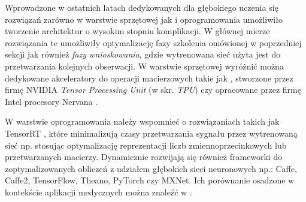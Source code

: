Wprowadzone w ostatnich latach dedykowanych dla głębokiego uczenia się rozwiązań zarówno w warstwie sprzętowej jak i oprogramowania umożliwiło tworzenie architektur o wysokim stopniu komplikacji. W głównej mierze rozwiązania te umożliwiły optymalizację fazy szkolenia omówionej w poprzedniej sekcji jak również \textit{fazy wnioskowania}, gdzie wytrenowana sieć użyta jest do przetwarzania kolejnych obserwacji. W warstwie sprzętowej wyróżnić można dedykowane akceleratory do operacji macierzowych takie jak \cite{DBLP:journals/corr/abs-1803-04014}, stworzone przez firmę NVIDIA \textit{Tensor Processing Unit} (w skr. \textit{TPU}) czy opracowane przez firmę Intel procesory Nervana \cite{Intel}. 

W warstwie oprogramowania należy wspomnieć o rozwiązaniach takich jak TensorRT \cite{TensorRT}, które minimalizują czasy przetwarzania sygnału przez wytrenowaną sieć np. stosując optymalizację reprezentacji liczb zmiennoprzecinkowych lub przetwarzanych macierzy. Dynamicznie rozwijają się również frameworki do zoptymalizowanych obliczeń z udziałem głębokich sieci neuronowych np.: Caffe, Caffe2, TensorFlow, Theano, PyTorch czy MXNet. Ich porównanie osadzone w kontekście aplikacji medycznych można znaleźć w \cite{Erickson2017}.

